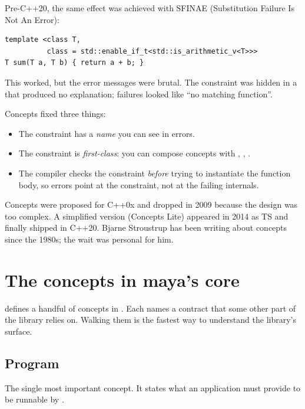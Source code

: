 Pre-C++20, the same effect was achieved with SFINAE (Substitution
Failure Is Not An Error):

\begin{lstlisting}
template <class T,
          class = std::enable_if_t<std::is_arithmetic_v<T>>>
T sum(T a, T b) { return a + b; }
\end{lstlisting}

This worked, but the error messages were brutal. The constraint
was hidden in a  that produced no
explanation; failures looked like ``no matching function''.

Concepts fixed three things:

\begin{itemize}[leftmargin=*]
  \item The constraint has a \emph{name} you can see in errors.
  \item The constraint is \emph{first-class}: you can compose
    concepts with \code{\&\&}, \code{||}, \code{!}.
  \item The compiler checks the constraint \emph{before} trying
    to instantiate the function body, so errors point at the
    constraint, not at the failing internals.
\end{itemize}

\begin{funfact}
Concepts were proposed for C++0x and dropped in 2009 because the
design was too complex. A simplified version (Concepts Lite)
appeared in 2014 as TS and finally shipped in C++20. Bjarne
Stroustrup has been writing about concepts since the 1980s; the
wait was personal for him.
\end{funfact}

\section{The concepts in maya's core}

\maya{} defines a handful of concepts in
. Each names a contract
that some other part of the library relies on. Walking them is
the fastest way to understand the library's surface.

\subsection*{Program}

The single most important concept. It states what an application
must provide to be runnable by .


